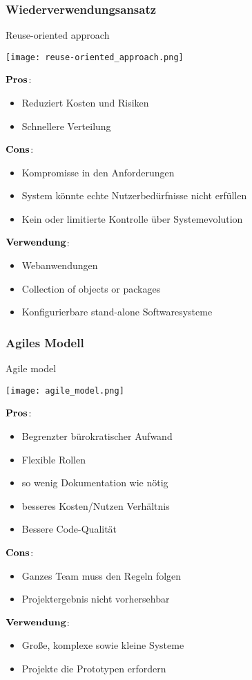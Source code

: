 \subsubsection{Wiederverwendungsansatz}
\begin{table}[H]
\caption{Reuse-oriented approach}
\texttt{[image: reuse-oriented\_approach.png]}
\end{table}
\begin{multicols}{2}
$\bold{Pros}$:
\begin{itemize}
	\item Reduziert Kosten und Risiken
	\item Schnellere Verteilung
\end{itemize}
\columnbreak
$\bold{Cons}$:
\begin{itemize}
	\item Kompromisse in den Anforderungen
	\item System könnte echte Nutzerbedürfnisse nicht erfüllen
	\item Kein oder limitierte Kontrolle über Systemevolution
\end{itemize}
\end{multicols}
$\bold{Verwendung}$:
\begin{itemize}
	\item Webanwendungen
	\item Collection of objects or packages
	\item Konfigurierbare stand-alone Softwaresysteme
\end{itemize}
\subsubsection{Agiles Modell}
\begin{table}[H]
\caption{Agile model}
\texttt{[image: agile\_model.png]}
\end{table}
\begin{multicols}{2}
$\bold{Pros}$:
\begin{itemize}
	\item Begrenzter bürokratischer Aufwand
	\item Flexible Rollen
	\item so wenig Dokumentation wie nötig
	\item besseres Kosten/Nutzen Verhältnis
	\item Bessere Code-Qualität
\end{itemize}
\columnbreak
$\bold{Cons}$:
\begin{itemize}
	\item Ganzes Team muss den Regeln folgen
	\item Projektergebnis nicht vorhersehbar
\end{itemize}
\end{multicols}
$\bold{Verwendung}$:
\begin{itemize}
	\item Große, komplexe sowie kleine Systeme
	\item Projekte die Prototypen erfordern 
\end{itemize}

